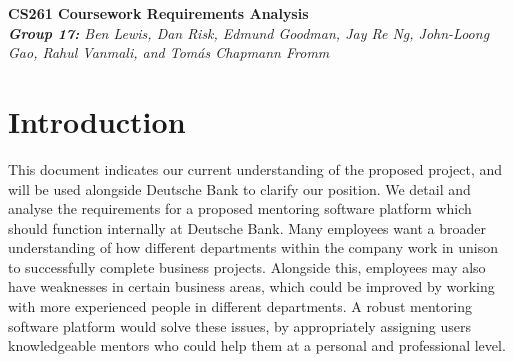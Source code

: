 \documentclass[10pt]{article}
\begin{document}
\begin{center}
    \Huge\textbf{CS261 Coursework Requirements Analysis}\\
    \vspace{2mm}
    \large{\textit{\textbf{Group 17:} Ben Lewis, Dan Risk, Edmund Goodman,
    Jay Re Ng, John-Loong Gao, Rahul Vanmali, and Tomás Chapmann Fromm}}
\end{center}


\vspace{-6mm}\section{Introduction}\vspace{-2mm}
This document indicates our current understanding of the proposed project, and
will be used alongside Deutsche Bank to clarify our position. We detail and
analyse the requirements for a proposed mentoring software platform which should
function internally at Deutsche Bank. Many employees want a broader
understanding of how different departments within the company work in unison to
successfully complete business projects. Alongside this, employees may also have
weaknesses in certain business areas, which could be improved by working with
more experienced people in different departments. A robust mentoring software
platform would solve these issues, by appropriately assigning users
knowledgeable mentors who could help them at a personal and professional level.
\end{document}
